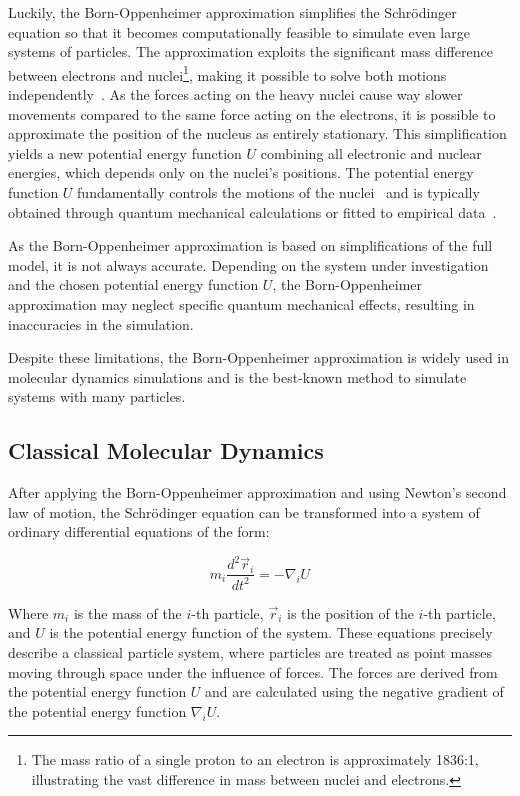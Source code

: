 Luckily, the Born-Oppenheimer approximation simplifies the Schrödinger equation so that it becomes computationally feasible to simulate even large systems of particles. The approximation exploits the significant mass difference between electrons and nuclei\footnote{
      The mass ratio of a single proton to an electron is approximately 1836:1, illustrating the vast difference in mass between nuclei and electrons.
}, making it possible to solve both motions independently~\cite{Zielinski2013}. As the forces acting on the heavy nuclei cause way slower movements compared to the same force acting on the electrons, it is possible to approximate the position of the nucleus as entirely stationary. This simplification yields a new potential energy function $U$ combining all electronic and nuclear energies, which depends only on the nuclei's positions.
The potential energy function $U$ fundamentally controls the motions of the nuclei~\cite{Zielinski2013} and is typically obtained through quantum mechanical calculations or fitted to empirical data~\cite{Irikura2021}.

As the Born-Oppenheimer approximation is based on simplifications of the full model, it is not always accurate. Depending on the system under investigation and the chosen potential energy function $U$, the Born-Oppenheimer approximation may neglect specific quantum mechanical effects, resulting in inaccuracies in the simulation.

Despite these limitations, the Born-Oppenheimer approximation is widely used in molecular dynamics simulations and is the best-known method to simulate systems with many particles.

\subsection{Classical Molecular Dynamics}

After applying the Born-Oppenheimer approximation and using Newton's second law of motion, the Schrödinger equation can be transformed into a system of ordinary differential equations of the form:

\begin{equation}
      m_i \frac{d^2 \vec{r}_i}{dt^2} = -\nabla_i U
\end{equation}

Where $m_i$ is the mass of the $i$-th particle, $\vec{r}_i$ is the position of the $i$-th particle, and $U$ is the potential energy function of the system. These equations precisely describe a classical particle system, where particles are treated as point masses moving through space under the influence of forces. The forces are derived from the potential energy function $U$ and are calculated using the negative gradient of the potential energy function $\nabla_i U$.

